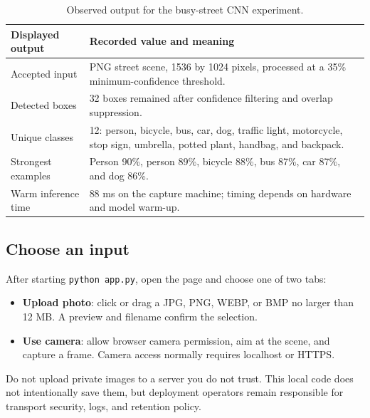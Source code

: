 \documentclass[12pt,a4paper,openany]{report}
\begin{document}
\begin{table}[H]
\centering\small
\caption{Observed output for the busy-street CNN experiment.}
\begin{tabularx}{\textwidth}{p{}Y}
\toprule
\textbf{Displayed output} & \textbf{Recorded value and meaning} \\
\midrule
Accepted input & PNG street scene, 1536 by 1024 pixels, processed at a 35\% minimum-confidence threshold. \\
Detected boxes & 32 boxes remained after confidence filtering and overlap suppression. \\
Unique classes & 12: person, bicycle, bus, car, dog, traffic light, motorcycle, stop sign, umbrella, potted plant, handbag, and backpack. \\
Strongest examples & Person 90\%, person 89\%, bicycle 88\%, bus 87\%, car 87\%, and dog 86\%. \\
Warm inference time & 88 ms on the capture machine; timing depends on hardware and model warm-up. \\
\bottomrule
\end{tabularx}
\end{table}

\subsection{Choose an input}
After starting \texttt{python app.py}, open the page and choose one of two tabs:
\begin{itemize}
  \item \textbf{Upload photo}: click or drag a JPG, PNG, WEBP, or BMP no larger
  than 12 MB. A preview and filename confirm the selection.
  \item \textbf{Use camera}: allow browser camera permission, aim at the scene,
  and capture a frame. Camera access normally requires localhost or HTTPS.
\end{itemize}
Do not upload private images to a server you do not trust. This local code does
not intentionally save them, but deployment operators remain responsible for
transport security, logs, and retention policy.
\end{document}
